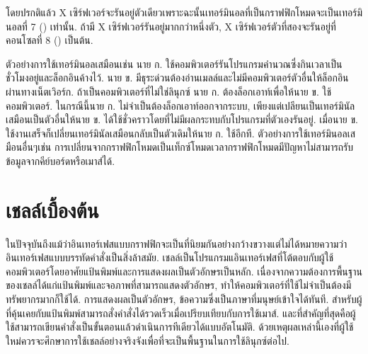 \begin{thwbr}
โดยปรกติแล้ว X เซิร์ฟเวอร์จะรันอยู่ตัวเดียวเพราะฉะนั้นเทอร์มินอลที่เป็นกราฟฟิกโหมดจะเป็นเทอร์มินอลที่ 7 () เท่านั้น. ถ้ามี X เซิร์ฟเวอร์รันอยู่มากกว่าหนึ่งตัว, X เซิร์ฟเวอร์ตัวที่สองจะรันอยู่ที่คอนโซลที่ 8 () เป็นต้น.

ตัวอย่างการใช้เทอร์มินอลเสมือนเช่น นาย ก. ใช้คอมพิวเตอร์รันโปรแกรมคำนวณซึ่งกินเวลาเป็นชั่วโมงอยู่และล็อกอินค้างไว้. นาย ข. มีธุระด่วนต้องอ่านเมลล์และไม่มีคอมพิวเตอร์ตัวอื่นให้ล็อกอินผ่านทางเน็ตเวิอร์ก. ถ้าเป็นคอมพิวเตอร์ที่ไม่ใช่ลินุกซ์ นาย ก. ต้องล็อกเอาท์เพื่อให้นาย ข. ใช้คอมพิวเตอร์. ในกรณีนี้นาย ก. ไม่จำเป็นต้องล็อกเอาท์ออกจากระบบ, เพียงแต่เปลียนเป็นเทอร์มินัลเสมือนเป็นตัวอื่นให้นาย ข. ได้ใช้ชั่วคราวโดยที่ไม่มีผลกระทบกับโปรแกรมที่ตัวเองรันอยู่. เมื่อนาย ข. ใช้งานเสร็จก็เปลี่ยนเทอร์มินัลเสมือนกลับเป็นตัวเดิมให้นาย ก. ใช้อีกที. ตัวอย่างการใช้เทอร์มินอลเสมือนอื่นๆเช่น การเปลี่ยนจากกราฟฟิกโหมดเป็นเท็กซ์โหมดเวลากราฟฟิกโหมดมีปัญหาไม่สามารถรับข้อมูลจากคีย์บอร์ดหรือเมาส์ได้. 

\section{เชลล์เบื้องต้น}
ในปัจจุบันถึงแม้ว่าอินเทอร์เฟสแบบกราฟฟิกจะเป็นที่นิยมกันอย่างกว้างขวางแต่ไม่ได้หมายความว่าอินเทอร์เฟสแบบบรรทัดคำสั่งเป็นสิ่งล้าสมัย. เชลล์เป็นโปรแกรมแอินเทอร์เฟสที่โต้ตอบกับผู้ใช้คอมพิวเตอร์โดยอาศัยแป้นพิมพ์และการแสดงผลเป็นตัวอักษรเป็นหลัก. เนื่องจากความต้องการพื้นฐานของเชลล์ได้แก่แป้นพิมพ์และจอภาพที่สามารถแสดงตัวอักษร, ทำให้คอมพิวเตอร์ที่ใช้ไม่จำเป็นต้องมีทรัพยากรมากก็ใช้ได้. การแสดงผลเป็นตัวอักษร, ข้อความซึ่งเป็นภาษาที่มนุษย์เข้าใจได้ทันที. สำหรับผู้ที่คุ้นเคยกับแป้นพิมพ์สามารถสั่งคำสั่งได้รวดเร็วเมื่อเปรียบเทียบกับการใช้เมาส์. %
และที่สำคัญที่สุดคือผู้ใช้สามารถเขียนคำสั่งเป็นขั้นตอนแล้วดำเนินการทีเดียวได้แบบอัตโนมัติ. ด้วยเหตุผลเหล่านี้เองที่ผู้ใช้ใหม่ควรจะศึกษาการใช้เชลล์อย่างจริงจังเพื่อที่จะเป็นพื้นฐานในการใช้ลินุกซ์ต่อไป. 


\end{thwbr}
